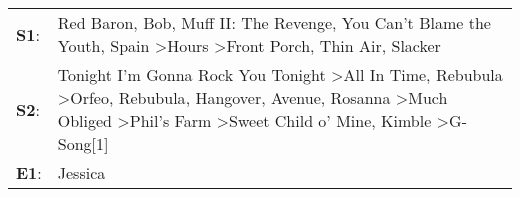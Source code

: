 \begin{supertabular}{p{0.03\textwidth}p{0.92\textwidth}}
 \textbf{S1}:  &                                                                                                                                                                                                                         Red Baron\textsuperscript{}, \enspace Bob\textsuperscript{}, \enspace Muff II: The Revenge\textsuperscript{}, \enspace You Can't Blame the Youth\textsuperscript{}, \enspace Spain\textsuperscript{} \textgreater \enspace Hours\textsuperscript{} \textgreater \enspace Front Porch\textsuperscript{}, \enspace Thin Air\textsuperscript{}, \enspace Slacker\textsuperscript{}  \enspace  \\
 \textbf{S2}:  &  Tonight I'm Gonna Rock You Tonight\textsuperscript{} \textgreater \enspace All In Time\textsuperscript{}, \enspace Rebubula\textsuperscript{} \textgreater \enspace Orfeo\textsuperscript{}, \enspace Rebubula\textsuperscript{}, \enspace Hangover\textsuperscript{}, \enspace Avenue\textsuperscript{}, \enspace Rosanna\textsuperscript{} \textgreater \enspace Much Obliged\textsuperscript{} \textgreater \enspace Phil's Farm\textsuperscript{} \textgreater \enspace Sweet Child o' Mine\textsuperscript{}, \enspace Kimble\textsuperscript{} \textgreater \enspace G-Song[1]\textsuperscript{}  \enspace  \\
 \textbf{E1}:  &                                                                                                                                                                                                                                                                                                                                                                                                                                                                                                                                                                               Jessica\textsuperscript{}  \enspace  \\
\end{supertabular}
